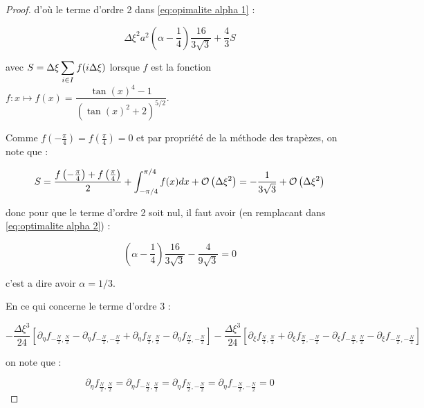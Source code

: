 \begin{proof}
d'où le terme d'ordre 2 dans \eqref{eq:opimalite alpha 1} :

\begin{equation}
\Delta \xi^2 a^2 \left( \alpha - \dfrac{1}{4} \right) \dfrac{16}{3 \sqrt{3}} + \dfrac{4}{3}S
\label{eq:optimalite alpha 2}
\end{equation}

avec $S=\Delta \xi \displaystyle\sum\limits_{i \in I} f(i \Delta \xi)$ lorsque $f$ est la fonction $f:x \mapsto f(x)=\dfrac{\tan(x)^4 -1}{(\tan(x)^2+2)^{5/2}}$.

Comme $f\left(-\frac{\pi}{4} \right)=f\left(\frac{\pi}{4} \right)=0$ et par propriété de la méthode des trapèzes, on note que :

\begin{equation}
S = \dfrac{f\left(-\frac{\pi}{4} \right)+f\left(\frac{\pi}{4} \right)}{2} + \displaystyle\int_{-\pi/4}^{\pi/4} f(x)dx + \mathcal{O}\left( \Delta \xi^2 \right) = -\dfrac{1}{3\sqrt{3}} + \mathcal{O}\left( \Delta \xi^2 \right)
\end{equation}

donc pour que le terme d'ordre 2 soit nul, il faut avoir (en remplacant dans  \eqref{eq:optimalite alpha 2}) :

\begin{equation}
\left(\alpha - \dfrac{1}{4} \right) \dfrac{16}{3 \sqrt{3}} - \dfrac{4}{9 \sqrt{3}} = 0
\end{equation}

c'est a dire avoir $\alpha = 1/3$.

En ce qui concerne le terme d'ordre 3 :

\begin{equation}
- \dfrac{\Delta \xi^3}{24} \left[ \partial_{\eta} f_{-\frac{N}{2},\frac{N}{2}} - \partial_{\eta} f_{-\frac{N}{2},-\frac{N}{2}} + \partial_{\eta} f_{\frac{N}{2},\frac{N}{2}} -\partial_{\eta} f_{\frac{N}{2},-\frac{N}{2}}  \right] -\dfrac{\Delta \xi^3}{24} \left[ \partial_{\xi} f_{\frac{N}{2},\frac{N}{2}} + \partial_{\xi} f_{\frac{N}{2},-\frac{N}{2}} - \partial_{\xi} f_{-\frac{N}{2},\frac{N}{2}} -\partial_{\xi} f_{-\frac{N}{2},-\frac{N}{2}}  \right]
\label{eq:opimalite alpha 3}
\end{equation}

on note que :

\begin{equation}
\partial_{\eta} f_{\frac{N}{2},\frac{N}{2}} = \partial_{\eta} f_{-\frac{N}{2},\frac{N}{2}} = \partial_{\eta} f_{\frac{N}{2},-\frac{N}{2}} = \partial_{\eta} f_{-\frac{N}{2},-\frac{N}{2}} = 0 
\end{equation}


\end{proof}
